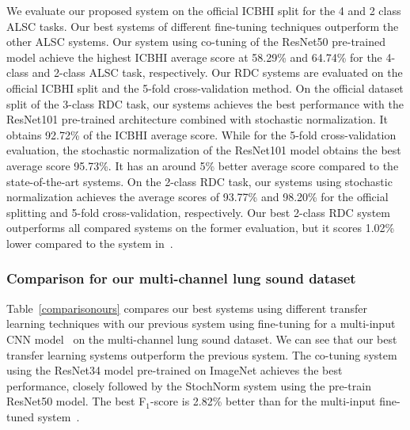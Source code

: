 \documentclass[journal]{IEEEtran}
\begin{document}
We evaluate our proposed system on the official ICBHI split for the  4 and 2 class ALSC tasks. Our best systems of different fine-tuning techniques outperform the other ALSC systems. Our system using co-tuning of the ResNet50 pre-trained model achieve the highest ICBHI average score at 58.29\% and 64.74\% for the 4-class and 2-class ALSC task, respectively. Our RDC systems are evaluated on the official ICBHI split and the 5-fold cross-validation method. On the official dataset split of the 3-class RDC task, our systems achieves the best performance with the ResNet101 pre-trained architecture combined with stochastic normalization. It obtains 92.72\% of the ICBHI average score. While for the 5-fold cross-validation evaluation, the stochastic normalization of the ResNet101 model obtains the best average score 95.73\%. It has an around 5\% better average score compared to the state-of-the-art systems. On the 2-class RDC task, our systems using stochastic normalization achieves the average scores of 93.77\% and 98.20\% for the official splitting and 5-fold cross-validation, respectively. Our best 2-class RDC system outperforms all compared systems on the former evaluation, but it scores 1.02\% lower compared to the system in~\cite{mukherjee2021automatic}.

\subsubsection{Comparison for our multi-channel lung sound dataset}
Table~\ref{comparisonours} compares our best systems using different transfer learning techniques with our previous system using fine-tuning for a multi-input CNN model~\cite{nguyen2021crackle} on the multi-channel lung sound dataset. We can see that our best transfer learning systems outperform the previous system. The co-tuning system using the ResNet34 model pre-trained on ImageNet achieves the best performance, closely followed by the StochNorm system using the pre-train ResNet50 model. The best F$_1$-score is 2.82\% better than for the multi-input fine-tuned system~\cite{nguyen2021crackle}. 
\end{document}
